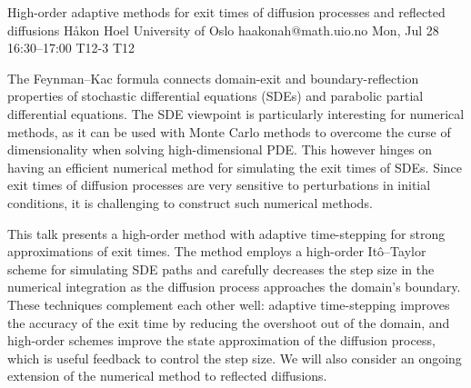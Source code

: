 \begin{talk}
  {High-order adaptive methods for exit times of diffusion processes and reflected diffusions}%
  {H{\aa}kon Hoel}%
  {University of Oslo}%
  {haakonah@math.uio.no}%
  {}%
  {}%
  {Mon, Jul 28 16:30--17:00}%
  {T12-3}%
  {T12}%
  {}%
  
    
   
\medskip
The Feynman--Kac formula connects domain-exit and boundary-reflection properties of stochastic differential equations (SDEs) and parabolic partial differential equations. The SDE viewpoint is particularly interesting for numerical methods, as it can be used with Monte Carlo methods to overcome the curse of dimensionality when solving high-dimensional PDE. This however hinges on having an efficient numerical method for simulating the exit times of SDEs. Since exit times of diffusion processes are very sensitive to perturbations in initial conditions, it is challenging to construct such numerical methods.

This talk presents a high-order method with adaptive time-stepping for strong approximations of exit times. The method employs a high-order It\^o--Taylor scheme for simulating SDE paths and carefully decreases the step size in the numerical integration as the diffusion process approaches the domain's boundary. These techniques complement each other well: adaptive time-stepping improves the accuracy of the exit time by reducing the overshoot out of the domain, and high-order schemes improve the state approximation of the diffusion process, which is useful feedback to control the step size. We will also consider an ongoing extension of the numerical method to reflected diffusions.

\end{talk}

